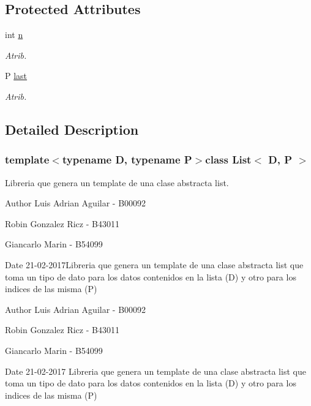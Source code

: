 \subsection*{Protected Attributes}
\begin{DoxyCompactItemize}
\item 
int \hyperlink{class_list_aa61221b9bda8b2b56a61bd869daacbfd}{n}
\begin{DoxyCompactList}\small\item\em Atrib. \end{DoxyCompactList}\item 
P \hyperlink{class_list_a32b9741aa48daca064edf0e83abf7a0f}{last}
\begin{DoxyCompactList}\small\item\em Atrib. \end{DoxyCompactList}\end{DoxyCompactItemize}


\subsection{Detailed Description}
\subsubsection*{template$<$typename D, typename P$>$class List$<$ D, P $>$}

Libreria que genera un template de una clase abstracta list. 

\begin{DoxyAuthor}{Author}
Luis Adrian Aguilar -\/ B00092 

Robin Gonzalez Ricz -\/ B43011 

Giancarlo Marin -\/ B54099 
\end{DoxyAuthor}
\begin{DoxyDate}{Date}
21-\/02-\/2017\+Libreria que genera un template de una clase abstracta list que toma un tipo de dato para los datos contenidos en la lista (D) y otro para los indices de las misma (P)
\end{DoxyDate}
\begin{DoxyAuthor}{Author}
Luis Adrian Aguilar -\/ B00092 

Robin Gonzalez Ricz -\/ B43011 

Giancarlo Marin -\/ B54099 
\end{DoxyAuthor}
\begin{DoxyDate}{Date}
21-\/02-\/2017 Libreria que genera un template de una clase abstracta list que toma un tipo de dato para los datos contenidos en la lista (D) y otro para los indices de las misma (P) 
\end{DoxyDate}


